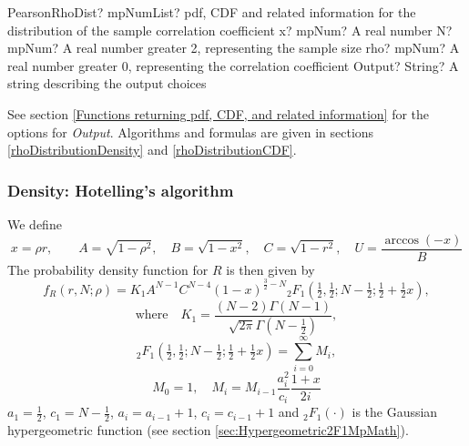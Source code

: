 \begin{mpFunctionsExtract}
	\mpFunctionFourNotImplemented
	{PearsonRhoDist? mpNumList? pdf, CDF and related information for the distribution of the sample correlation coefficient}
	{x? mpNum? A real number}
	{N? mpNum? A real number greater 2, representing the sample size}
	{rho? mpNum? A real number greater 0, representing the correlation coefficient}
	{Output? String? A string describing the output choices}
\end{mpFunctionsExtract}


\vspace{0.3cm}
See section \ref{Functions returning pdf, CDF, and related information} for the options for {\itshape\sffamily Output}. Algorithms and formulas are given in sections \ref{rhoDistributionDensity} and \ref{rhoDistributionCDF}.

\subsubsection{Density: Hotelling's algorithm}
\label{rhoDistributionDensity}

We define
\begin{equation}  \label{eq:PearsonRho_Def_ABCU}
	x = \rho r,\quad \quad  A=\sqrt{1-\rho^2}, \quad B=\sqrt{1-x^2}, \quad C=\sqrt{1-r^2}, \quad U=\frac{\arccos(-x)}{B}
\end{equation}
The probability density function for $R$ is then given by \citep{hotelling_1953}
\begin{equation} \label{eq:PearsonRho_PDF_Ik_def}
	f_R(r, N; \rho) = K_1 A^{N-1} C^{N-4} (1-x)^{\tfrac{3}{2}-N}{}_2F_1\left(\tfrac{1}{2},\tfrac{1}{2}; N-\tfrac{1}{2}; \tfrac{1}{2}+\tfrac{1}{2}x\right),
\end{equation}
\begin{equation}  \label{eq:PearsonRho_K1}
	\text{where}  \quad  K_1 = \frac{(N-2)\Gamma(N-1)}{\sqrt{2\pi}\Gamma\left(N-\tfrac{1}{2}\right)},  
\end{equation}
\begin{equation}  \label{eq:PearsonRho_T1}
	{}_2F_1\left(\tfrac{1}{2},\tfrac{1}{2}; N-\tfrac{1}{2}; \tfrac{1}{2}+\tfrac{1}{2}x\right) =  \sum_{i=0}^{\infty} M_i,
\end{equation}
\begin{equation} 
	M_0= 1, \quad M_i = M_{i-1} \frac{a_i^2}{c_i} \frac{1+x}{2i}
\end{equation}
$a_1=\tfrac{1}{2}$, $c_1 = N-\tfrac{1}{2}$, $a_i=a_{i-1}+1$, $c_i=c_{i-1}+1$ and ${}_2F_1(\cdot)$ is the Gaussian hypergeometric function (see section \ref{sec:Hypergeometric2F1MpMath}).


